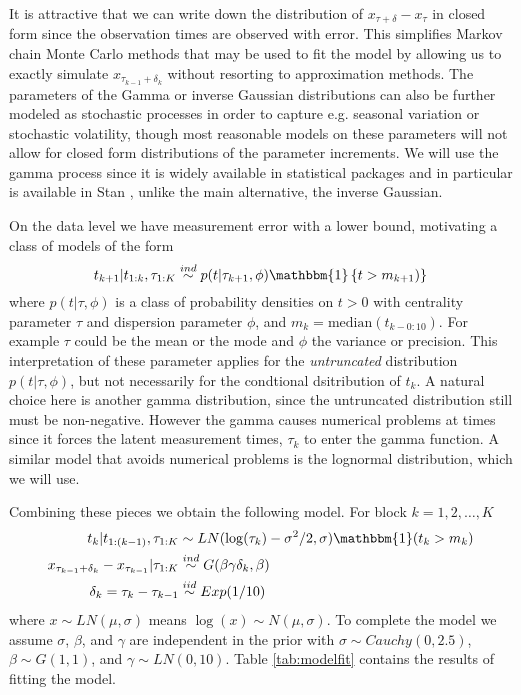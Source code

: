 \documentclass{article}
\begin{document}
It is attractive that we can write down the distribution of $x_{\tau + \delta} - x_\tau$ in closed form since the observation times are observed with error. This simplifies Markov chain Monte Carlo methods that may be used to fit the model by allowing us to exactly simulate $x_{\tau_{k-1} + \delta_k}$ without resorting to approximation methods. The parameters of the Gamma or inverse Gaussian distributions can also be further modeled as stochastic processes in order to capture e.g. seasonal variation or stochastic volatility, though most reasonable models on these parameters will not allow for closed form distributions of the parameter increments. We will use the gamma process since it is widely available in statistical packages and in particular is available in Stan \citep{stan-software:2015}, unlike the main alternative, the inverse Gaussian.

On the data level we have measurement error with a lower bound, motivating a class of models of the form 
\[
t_{k+1} |t_{1:k}, \tau_{1:K} \stackrel{ind}{\sim} p(t|\tau_{k+1}, \phi)\mathbbm{1}\left\{t > m_{k+1})\right\}
\]
where $p(t|\tau,\phi)$ is a class of probability densities on $t>0$ with centrality parameter $\tau$ and dispersion parameter $\phi$, and $m_k = \mathrm{median}(t_{k - 0:10})$. For example $\tau$ could be the mean or the mode and $\phi$ the variance or precision. This interpretation of these parameter applies for the {\it untruncated} distribution $p(t|\tau,\phi)$, but not necessarily for the condtional dsitribution of $t_k$. A natural choice here is another gamma distribution, since the untruncated distribution still must be non-negative. However the gamma causes numerical problems at times since it forces the latent measurement times, $\tau_k$ to enter the gamma function. A similar model that avoids numerical problems is the lognormal distribution, which we will use.

Combining these pieces we obtain the following model. For block $k=1,2,\dots,K$
\begin{align*}
t_k|t_{1:(k-1)}, \tau_{1:K} &\sim LN(\log(\tau_k) - \sigma^2/2, \sigma)\mathbbm{1}(t_k > m_k)\\
x_{\tau_{k-1} + \delta_k} - x_{\tau_{k-1}}|\tau_{1:K} & \stackrel{ind}{\sim} G(\beta\gamma\delta_k,\beta)\\
\delta_{k} = \tau_{k} - \tau_{k-1} &\stackrel{iid}{\sim} Exp(1/10)
\end{align*}
where $x\sim LN(\mu,\sigma)$ means $\log(x) \sim N(\mu,\sigma)$. To complete the model we assume $\sigma$, $\beta$, and $\gamma$ are independent in the prior with $\sigma \sim Cauchy(0, 2.5)$, $\beta \sim G(1, 1)$, and $\gamma \sim LN(0, 10)$. Table \ref{tab:modelfit} contains the results of fitting the model.
\end{document}
